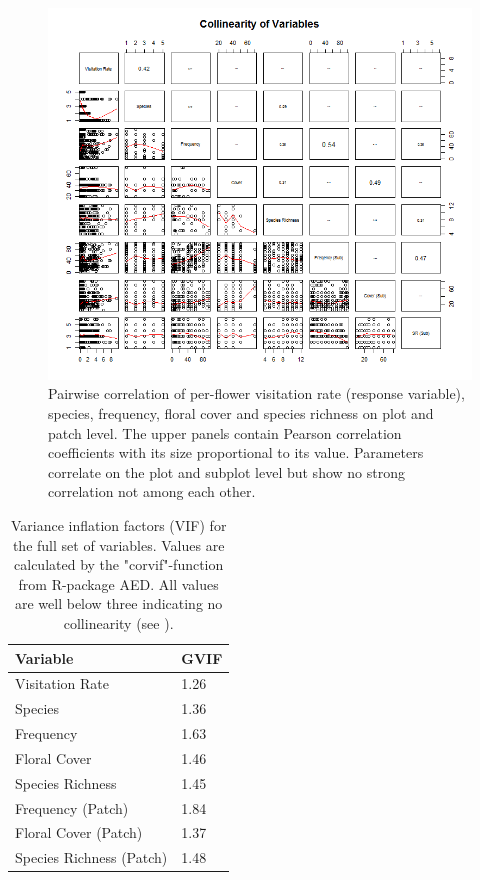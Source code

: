 \newpage

\begin{figure} [H] %
\centering
\includegraphics[width=16cm]{Images/pairs-plot}
 \caption{Pairwise correlation of per-flower visitation rate (response variable), species, frequency, floral cover and species richness on plot and patch level. The upper panels contain Pearson correlation coefficients with its size proportional to its value. Parameters correlate on the plot and subplot level but show no strong correlation not among each other.}
 \label{fig:pairs-plot}
\end{figure}


\begin{table}[!htbp] 
  \centering
  \caption{Variance inflation factors (VIF) for the full set of variables. Values are calculated by the "corvif"-function from R-package AED. All values are well below three indicating no collinearity (see \citealt{zuur2007analysing}).}
    \begin{tabular}{ll}
    \toprule
    \textbf{Variable} & \textbf{GVIF}\\
    \midrule
    Visitation Rate  	&  1.26\\
    Species 			 &  1.36\\
    Frequency 	  	    &  1.63\\
    Floral Cover   		 &  1.46\\
    Species Richness     &  1.45\\
    Frequency (Patch) 	    &  1.84\\
    Floral Cover (Patch)		  &  1.37\\
    Species Richness (Patch)    &  1.48\\
    \bottomrule
    \end{tabular}%
\label{tab:VIF}
\end{table}%

